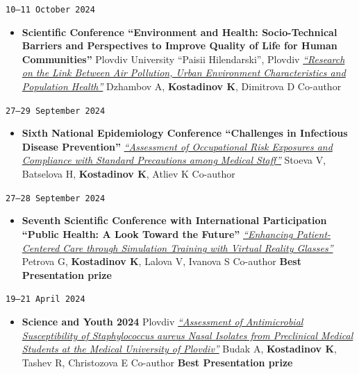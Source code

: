 \documentclass[
  10.5pt,
  a4paper,
  DIV=11,
  numbers=noendperiod]{scrartcl}
\providecommand{\tightlist}{%
  \setlength{\itemsep}{0pt}\setlength{\parskip}{0pt}}
\let\oldtexttt\texttt
\renewcommand{\texttt}[1]{{\color{cvbronze}\small\oldtexttt{#1}}}
\begin{document}
\texttt{10–11\ October\ 2024}

\begin{itemize}
\tightlist
\item
  \textbf{Scientific Conference ``Environment and Health:
  Socio-Technical Barriers and Perspectives to Improve Quality of Life
  for Human Communities''} \textbar{} Plovdiv University ``Paisii
  Hilendarski'', Plovdiv \textbar{}
  \emph{\href{https://hiddeneurope-jeanmonnet.uni-plovdiv.net/event/\%D0\%BD\%D0\%B0\%D1\%83\%D1\%87\%D0\%BD\%D0\%B0-\%D0\%BA\%D0\%BE\%D0\%BD\%D1\%84\%D0\%B5\%D1\%80\%D0\%B5\%D0\%BD\%D1\%86\%D0\%B8\%D1\%8F-\%D0\%BE\%D0\%BA\%D0\%BE\%D0\%BB\%D0\%BD\%D0\%B0-\%D1\%81\%D1\%80\%D0\%B5\%D0\%B4\%D0\%B0-\%D0\%B8-\%D0\%B7\%D0\%B4\%D1\%80/}{``Research
  on the Link Between Air Pollution, Urban Environment Characteristics
  and Population Health''}} \textbar{} Dzhambov A, \textbf{Kostadinov
  K}, Dimitrova D \textbar{} Co-author
\end{itemize}

\texttt{27–29\ September\ 2024}

\begin{itemize}
\tightlist
\item
  \textbf{Sixth National Epidemiology Conference ``Challenges in
  Infectious Disease Prevention''} \textbar{}
  \emph{\href{http://bulepid.org/_upload2018/PROGRAMA\%202024-final.pdf}{``Assessment
  of Occupational Risk Exposures and Compliance with Standard
  Precautions among Medical Staff''}} \textbar{} Stoeva V, Batselova H,
  \textbf{Kostadinov K}, Atliev K \textbar{} Co-author
\end{itemize}

\texttt{27–28\ September\ 2024}

\begin{itemize}
\tightlist
\item
  \textbf{Seventh Scientific Conference with International Participation
  ``Public Health: A Look Toward the Future''} \textbar{}
  \emph{\href{https://publisher.mu-plovdiv.bg/wp-content/uploads/published-online/public-health-conf/2024/abstract-book.html\#p=56}{``Enhancing
  Patient-Centered Care through Simulation Training with Virtual Reality
  Glasses''}} \textbar{} Petrova G, \textbf{Kostadinov K}, Lalova V,
  Ivanova S \textbar{} Co-author \textbar{} \textbf{Best Presentation
  prize}
\end{itemize}

\texttt{19–21\ April\ 2024}

\begin{itemize}
\tightlist
\item
  \textbf{Science and Youth 2024} \textbar{} Plovdiv \textbar{}
  \emph{\href{https://asclepius.bg/cnm/wp-content/uploads/2024/04/SY-DMS-2024-abstracts-web.pdf}{``Assessment
  of Antimicrobial Susceptibility of Staphylococcus aureus Nasal
  Isolates from Preclinical Medical Students at the Medical University
  of Plovdiv''}} \textbar{} Budak A, \textbf{Kostadinov K}, Tashev R,
  Christozova E \textbar{} Co-author \textbar{} \textbf{Best
  Presentation prize}
\end{itemize}
\end{document}
